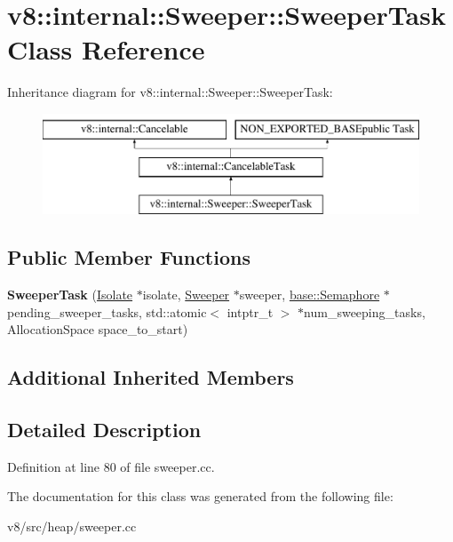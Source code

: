 \hypertarget{classv8_1_1internal_1_1Sweeper_1_1SweeperTask}{}\section{v8\+:\+:internal\+:\+:Sweeper\+:\+:Sweeper\+Task Class Reference}
\label{classv8_1_1internal_1_1Sweeper_1_1SweeperTask}
Inheritance diagram for v8\+:\+:internal\+:\+:Sweeper\+:\+:Sweeper\+Task\+:\begin{figure}[H]
\begin{center}
\leavevmode
\includegraphics[height=3.000000cm]{classv8_1_1internal_1_1Sweeper_1_1SweeperTask}
\end{center}
\end{figure}
\subsection*{Public Member Functions}
\begin{DoxyCompactItemize}
\item 
\mbox{\label{classv8_1_1internal_1_1Sweeper_1_1SweeperTask_ad0c26f556c3e4dc3d15ebb9ccc1d72a9}} 
{\bfseries Sweeper\+Task} (\mbox{\hyperlink{classv8_1_1internal_1_1Isolate}{Isolate}} $\ast$isolate, \mbox{\hyperlink{classv8_1_1internal_1_1Sweeper}{Sweeper}} $\ast$sweeper, \mbox{\hyperlink{classv8_1_1base_1_1Semaphore}{base\+::\+Semaphore}} $\ast$pending\+\_\+sweeper\+\_\+tasks, std\+::atomic$<$ intptr\+\_\+t $>$ $\ast$num\+\_\+sweeping\+\_\+tasks, Allocation\+Space space\+\_\+to\+\_\+start)
\end{DoxyCompactItemize}
\subsection*{Additional Inherited Members}


\subsection{Detailed Description}


Definition at line 80 of file sweeper.\+cc.



The documentation for this class was generated from the following file\+:\begin{DoxyCompactItemize}
\item 
v8/src/heap/sweeper.\+cc\end{DoxyCompactItemize}
